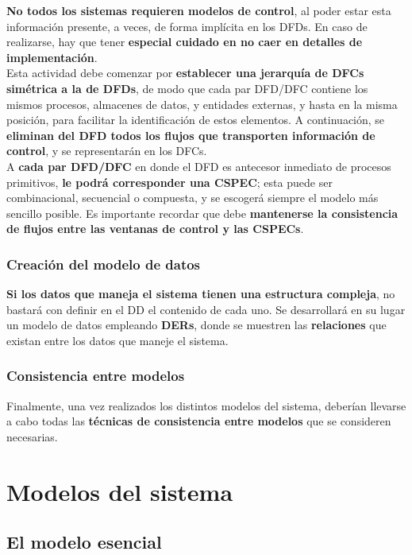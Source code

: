 \textbf{No todos los sistemas requieren modelos de control}, al poder estar esta información presente, a veces, de forma implícita en los DFDs. En caso de realizarse, hay que tener \textbf{especial cuidado en no caer en detalles de implementación}.\\

Esta actividad debe comenzar por \textbf{establecer una jerarquía de DFCs simétrica a la de DFDs}, de modo que cada par DFD/DFC contiene los mismos procesos, almacenes de datos, y entidades externas, y hasta en la misma posición, para facilitar la identificación de estos elementos. A continuación, se \textbf{eliminan del DFD todos los flujos que transporten información de control}, y se representarán en los DFCs.\\

A \textbf{cada par DFD/DFC} en donde el DFD es antecesor inmediato de procesos primitivos, \textbf{le podrá corresponder una CSPEC}; esta puede ser combinacional, secuencial o compuesta, y se escogerá siempre el modelo más sencillo posible. Es importante recordar que debe \textbf{mantenerse la consistencia de flujos entre las ventanas de control y las CSPECs}.

\subsubsection{Creación del modelo de datos}

\textbf{Si los datos que maneja el sistema tienen una estructura compleja}, no bastará con definir en el DD el contenido de cada uno. Se desarrollará en su lugar un modelo de datos empleando \textbf{DERs}, donde se muestren las \textbf{relaciones} que existan entre los datos que maneje el sistema.

\subsubsection{Consistencia entre modelos}

Finalmente, una vez realizados los distintos modelos del sistema, deberían llevarse a cabo todas las \textbf{técnicas de consistencia entre modelos} que se consideren necesarias.


\section{Modelos del sistema}

\subsection{El modelo esencial}

